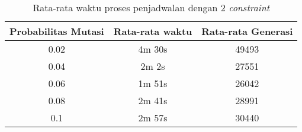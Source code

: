 \begin{longtable}[c]{|c|c|c|}
  \caption{Rata-rata waktu proses penjadwalan dengan 2 \textit{constraint}}
  \label{tab:2 constraint}\\
  \hline
  \rowcolor[HTML]{C0C0C0} 
  Probabilitas Mutasi & Rata-rata waktu & Rata-rata Generasi \\ \hline
  0.02                & 4m 30s          & 49493               \\ \hline
  0.04                & 2m 2s           & 27551              \\ \hline
  0.06                & 1m 51s          & 26042               \\ \hline
  0.08                & 2m 41s          & 28991               \\ \hline
  0.1                 & 2m 57s          & 30440               \\ \hline
  \end{longtable}

